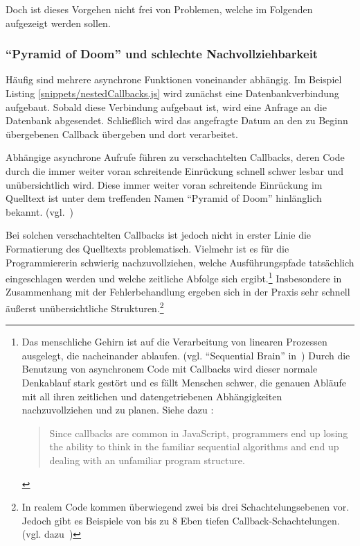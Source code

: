 \documentclass[
11pt, %
a4paper, %
oneside, %
pdfspacing, %
headinclude,
BCOR5mm, %
ngerman, %
bibtotocnumbered,
]{scrartcl}
\begin{document}
	Doch ist dieses Vorgehen nicht frei von Problemen, welche im Folgenden aufgezeigt werden sollen.
	
	\subsubsection["`Pyramid of Doom"']{"`Pyramid of Doom"' und schlechte Nachvollziehbarkeit}
	
	Häufig sind mehrere asynchrone Funktionen voneinander abhängig. Im Beispiel Listing \ref{snippets/nestedCallbacks.js} wird zunächst eine Datenbankverbindung aufgebaut. Sobald diese Verbindung aufgebaut ist, wird eine Anfrage an die Datenbank abgesendet. Schließlich wird das angefragte Datum an den zu Beginn übergebenen Callback übergeben und dort verarbeitet.
	
	
	Abhängige asynchrone Aufrufe führen zu verschachtelten Callbacks, deren Code durch die immer weiter voran schreitende Einrückung schnell schwer lesbar und unübersichtlich wird.
	 Diese immer weiter voran schreitende Einrückung im Quelltext ist unter dem treffenden Namen "`Pyramid of Doom"' hinlänglich bekannt. (vgl.~\citep[\S~1]{KennedyKambona.2013})
	
	Bei solchen verschachtelten Callbacks ist jedoch nicht in erster Linie die Formatierung des Quelltexts problematisch. Vielmehr ist es für die Programmiererin schwierig nachzuvollziehen, welche Ausführungspfade tatsächlich eingeschlagen werden und welche zeitliche Abfolge sich ergibt.\footnote{Das menschliche Gehirn ist auf die Verarbeitung von linearen Prozessen ausgelegt, die nacheinander ablaufen. (vgl. "`Sequential Brain"' in~\citep[~27ff.]{Simpson.2015}) Durch die Benutzung von asynchronem Code mit Callbacks wird dieser normale Denkablauf stark gestört und es fällt Menschen schwer, die genauen Abläufe mit all ihren zeitlichen und datengetriebenen Abhängigkeiten nachzuvollziehen und zu planen. Siehe dazu \citep{KennedyKambona.2013}: 
		
		\begin{quote}Since callbacks are common in JavaScript, programmers end up losing the ability to think in the familiar sequential algorithms and end up dealing with an unfamiliar program structure.\end{quote}} Insbesondere in Zusammenhang mit der Fehlerbehandlung ergeben sich in der Praxis sehr schnell äußerst unübersichtliche Strukturen.\footnote{In realem Code kommen überwiegend zwei bis drei Schachtelungsebenen vor. Jedoch gibt es Beispiele von bis zu 8 Eben tiefen Callback-Schachtelungen. (vgl. dazu~\citep[\S~IV.D]{Gallaba.b})}
\end{document}
